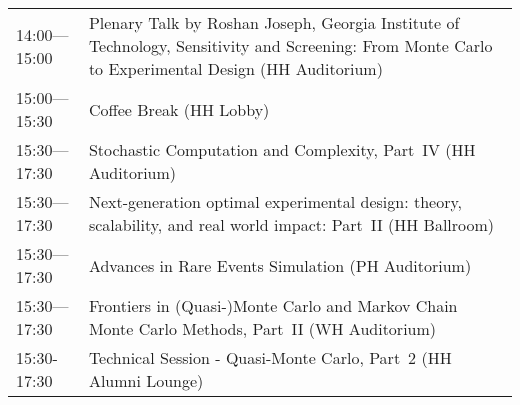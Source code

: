 \begin{table}
{\begin{tabularx}{\textwidth}{>{\hsize=0.32\hsize}X|>{\hsize=1.7\hsize}X}
\cellcolor{\PlenaryColor}14:00---15:00 & \cellcolor{\PlenaryColor}Plenary Talk by Roshan Joseph, Georgia Institute of Technology, Sensitivity and Screening: From Monte Carlo to Experimental Design (HH Auditorium) \\
\cellcolor{\EmptyColor}15:00---15:30 & \cellcolor{\EmptyColor}Coffee Break (HH Lobby) \\
\cellcolor{\SessionTitleColor}15:30---17:30 & \cellcolor{\SessionTitleColor}Stochastic Computation and Complexity, Part~IV (HH Auditorium) \\
\cellcolor{\SessionTitleColor}15:30---17:30 & \cellcolor{\SessionTitleColor}Next-generation optimal experimental design: theory, scalability, and real world impact: Part~II (HH Ballroom) \\
\cellcolor{\SessionTitleColor}15:30---17:30 & \cellcolor{\SessionTitleColor}Advances in Rare Events Simulation (PH Auditorium) \\
\cellcolor{\SessionTitleColor}15:30---17:30 & \cellcolor{\SessionTitleColor}Frontiers in (Quasi-)Monte Carlo and Markov Chain Monte Carlo Methods, Part~II (WH Auditorium) \\
\cellcolor{\SessionLightColor}15:30-17:30 & \cellcolor{\SessionLightColor}Technical Session - Quasi-Monte Carlo, Part~2 (HH Alumni Lounge) \\
\hline
\end{tabularx}
}
\end{table}

